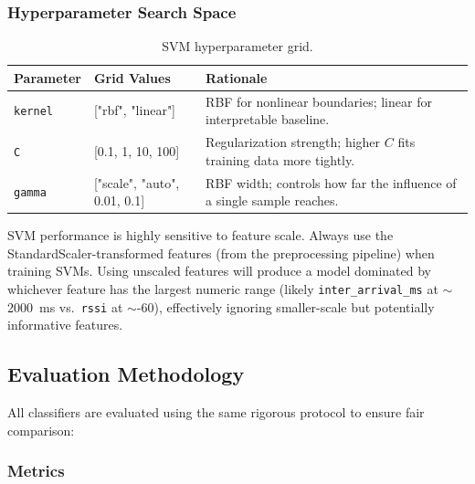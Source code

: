 \documentclass[11pt,letterpaper]{article}
\begin{document}
	\subsubsection{Hyperparameter Search Space}

	\begin{table}[ht!]
		\centering
		\caption{SVM hyperparameter grid.}
		\label{tab:svm_grid}
		\renewcommand{\arraystretch}{1.3}
		\begin{tabularx}{\textwidth}{l l X}
			\toprule
			\textbf{Parameter} & \textbf{Grid Values} & \textbf{Rationale} \\
			\midrule
			\texttt{kernel} & ["rbf", "linear"] & RBF for nonlinear boundaries; linear for interpretable baseline. \\
			\texttt{C} & [0.1, 1, 10, 100] & Regularization strength; higher $C$ fits training data more tightly. \\
			\texttt{gamma} & ["scale", "auto", 0.01, 0.1] & RBF width; controls how far the influence of a single sample reaches. \\
			\bottomrule
		\end{tabularx}
	\end{table}

	\begin{tcolorbox}[warning={SVM Scaling Requirement}]
		SVM performance is highly sensitive to feature scale. Always use the StandardScaler-transformed features (from the preprocessing pipeline) when training SVMs. Using unscaled features will produce a model dominated by whichever feature has the largest numeric range (likely \texttt{inter\_arrival\_ms} at $\sim$2000~ms vs.\ \texttt{rssi} at $\sim$-60), effectively ignoring smaller-scale but potentially informative features.
	\end{tcolorbox}

	\subsection{Evaluation Methodology}

	All classifiers are evaluated using the same rigorous protocol to ensure fair comparison:

	\subsubsection{Metrics}
\end{document}
